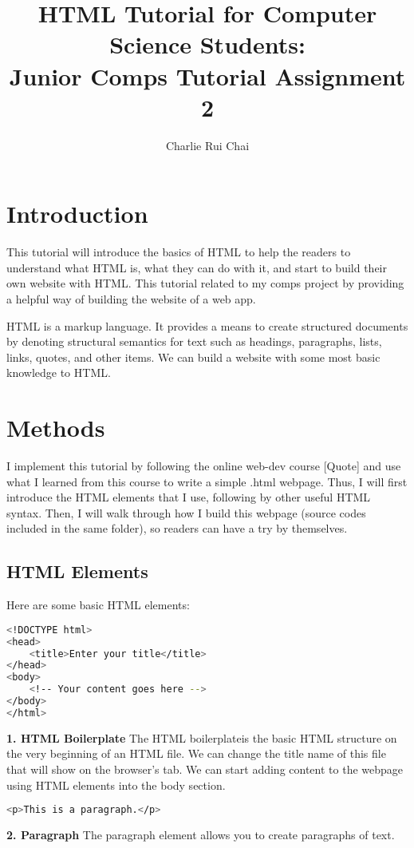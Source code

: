 \documentclass[10pt,twocolumn]{article}
\title{HTML Tutorial for Computer Science Students:\\
Junior Comps Tutorial Assignment 2}
\author{Charlie Rui Chai}
\affiliation{Occidental College}
\begin{document}
\maketitle

\section{Introduction}

This tutorial will introduce the basics of HTML to help the readers to understand what HTML is, what they can do with it, and start to build their own website with HTML. This tutorial related to my comps project by providing a helpful way of building the website of a web app.

HTML is a markup language. It provides a means to create structured documents by denoting structural semantics for text such as headings, paragraphs, lists, links, quotes, and other items. We can build a website with some most basic knowledge to HTML.


\section{Methods}

I implement this tutorial by following the online web-dev course [Quote] and use what I learned from this course to write a simple .html webpage. Thus, I will first introduce the HTML elements that I use, following by other useful HTML syntax. Then, I will walk through how I build this webpage (source codes included in the same folder), so readers can have a try by themselves.

\subsection{HTML Elements}
Here are some basic HTML elements:

\begin{lstlisting}[language=bash]
<!DOCTYPE html>
<head>
    <title>Enter your title</title>
</head>
<body>
    <!-- Your content goes here -->
</body>
</html>
\end{lstlisting}

\textbf{1. HTML Boilerplate} The HTML boilerplateis the basic HTML structure on the very beginning of an HTML file. We can change the title name of this file that will show on the browser's tab. We can start adding content to the webpage using HTML elements into the body section.


\begin{lstlisting}[language=bash]
<p>This is a paragraph.</p>
\end{lstlisting}
\textbf{2. Paragraph} The paragraph element allows you to create paragraphs of text.
\end{document}
